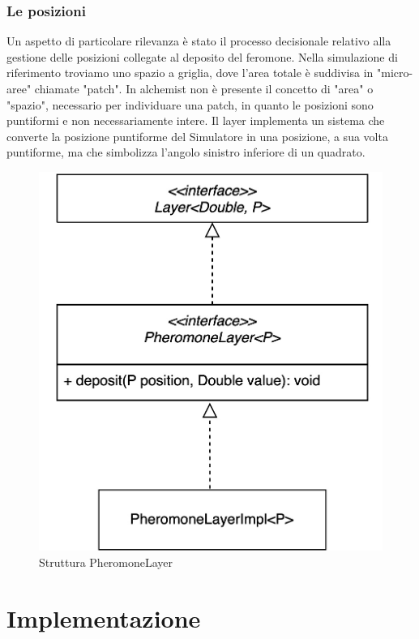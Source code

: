 \documentclass[12pt,a4paper,openright,twoside]{book}
\begin{document}
\subsection{Le posizioni}
Un aspetto di particolare rilevanza è stato il processo decisionale relativo alla gestione delle posizioni collegate 
al deposito del feromone. Nella simulazione di riferimento troviamo uno spazio a griglia, dove l'area totale è suddivisa
in "micro-aree" chiamate "patch". In alchemist non è presente il concetto di "area" o "spazio", necessario per individuare una patch,
in quanto le posizioni sono puntiformi e non necessariamente intere. Il layer implementa un sistema che converte la posizione puntiforme
del Simulatore in una posizione, a sua volta puntiforme, ma che simbolizza l'angolo sinistro inferiore di un quadrato.



\begin{figure}[h!]
    \centering
    \includegraphics[width=.8\linewidth]{figures/pheromoneLayer.jpeg}
    \caption{Struttura PheromoneLayer}
    \label{fig:phLayer}
\end{figure}

%

\chapter{Implementazione}
\end{document}
